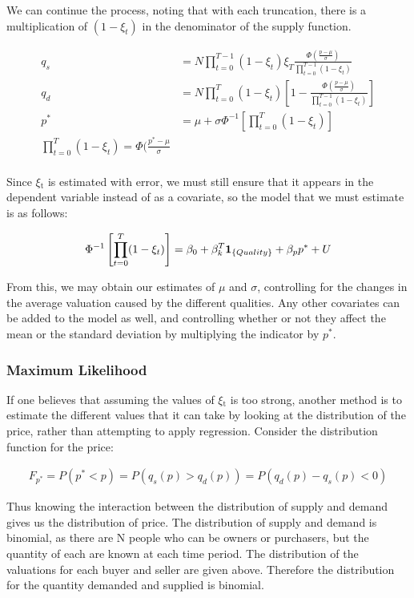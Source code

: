 \documentclass[12pt, letterpaper]{paper}
\begin{document}
We can continue the process, noting that with each truncation, there
is a multiplication of $(1-\xi_t)$ in the denominator of the supply
function.

\begin{align*}
q_s &= N \prod_{t=0}^{T-1} (1-\xi_t ) \xi_T \frac{\Phi \left ( \frac{ p - \mu }{\sigma} \right )}{ \prod_{t=0}^{T-1} ( 1 - \xi_t ) }\\
q_d &= N \prod_{t=0}^{T} ( 1- \xi_t ) \left [ 1 - \frac{ \Phi \left ( \frac{
p - \mu }{ \sigma } \right ) }{ \prod_{t=0}^{T-1} (1 - \xi_t ) } \right ]\\
p^* &= \mu + \sigma \Phi^{-1} \left [ \prod_{t=0}^T ( 1 - \xi_t ) \right ]\\
\prod_{t=0}^T ( 1- \xi_t) = \Phi( \frac{ p^* - \mu }{ \sigma} \\
\end{align*}

Since $\xi$$_{\text{t}}$ is estimated with error, we must still ensure that it appears
in the dependent variable instead of as a covariate, so the model that
we must estimate is as follows:

\begin{align*}
\Phi^{-1 }\left [ \prod_{t=0}^T ( 1 - \xi_t ) \right ] = \beta_0 + \beta_k^T \bold{1}_{\{Quality\}} + \beta_p p^* +
U
\end{align*}

From this, we may obtain our estimates of $\mu$ and $\sigma$, controlling for the
changes in the average valuation caused by the different
qualities. Any other covariates can be added to the model as well, and
controlling whether or not they affect the mean or the standard
deviation by multiplying the indicator by $p^*$. 

\subsubsection{Maximum Likelihood}
\label{sec-2-3-2}

If one believes that assuming the values of $\xi$$_{\text{t}}$ is too strong, another
method is to estimate the different values that it can take by looking
at the distribution of the price, rather than attempting to apply
regression. Consider the distribution function for the price:

\begin{align*}
F_{p^*} = P( p^* < p ) = P( q_s (p) > q_d (p) ) = P( q_d (p) - q_s (p) < 0 )
\end{align*}

Thus knowing the interaction between the distribution of supply and
demand gives us the distribution of price. The distribution of supply
and demand is binomial, as there are N people who can be owners or
purchasers, but the quantity of each are known at each time
period. The distribution of the valuations for each buyer and seller
are given above. Therefore the distribution for the quantity demanded
and supplied is binomial.
\end{document}
